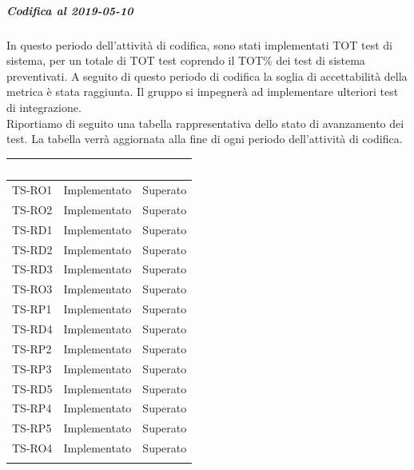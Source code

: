 \subparagraph{Codifica al 2019-05-10}
In questo periodo dell'attività di codifica, sono stati implementati TOT test di sistema, per un totale di TOT test coprendo il TOT\% dei test di sistema preventivati.
A seguito di questo periodo di codifica la soglia di accettabilità della metrica è stata raggiunta.
Il gruppo si impegnerà ad implementare ulteriori test di integrazione.\\
Riportiamo di seguito una tabella rappresentativa dello stato di avanzamento dei test. La tabella verrà aggiornata alla fine di ogni periodo dell'attività di codifica.


\begin{longtable}{|>{\centering\arraybackslash}m{1.6cm}|>{\centering\arraybackslash}m{6.41cm}|>{\centering\arraybackslash}m{3.1cm}|}		
	\rowcolor{LightBlue}
	\textbf{\textcolor{white}{Test}}
	& \textbf{\textcolor{white}{Stato}}
	& \textbf{\textcolor{white}{Esito}}\\
	\hline
		\rowcolor{LightGray}
		TS-RO1
		& Implementato
		& Superato 
		\\ \hline
		\rowcolor{white}
		TS-RO2
		& Implementato
		& Superato 
		\\ \hline
		\rowcolor{LightGray}
		TS-RD1
		& Implementato
		& Superato 
		\\ \hline
		\rowcolor{white}
		TS-RD2
		& Implementato
		& Superato 
		\\ \hline
		\rowcolor{LightGray}
		TS-RD3
		& Implementato
		& Superato 
		\\ \hline
		\rowcolor{white}
		TS-RO3		
		& Implementato
		& Superato 
		\\ \hline
		\rowcolor{LightGray}
		TS-RP1		
		& Implementato
		& Superato 
		\\ \hline
		\rowcolor{white}
		TS-RD4		
		& Implementato
		& Superato 
		\\ \hline
		\rowcolor{LightGray}
		TS-RP2		
		& Implementato
		& Superato 
		\\ \hline
		\rowcolor{white}
		TS-RP3		
		& Implementato
		& Superato 
		\\ \hline
		\rowcolor{LightGray}
		TS-RD5		
		& Implementato
		& Superato 
		\\ \hline
		\rowcolor{white}
		TS-RP4		
		& Implementato
		& Superato 
		\\ \hline
		\rowcolor{LightGray}
		TS-RP5		
		& Implementato
		& Superato 
		\\ \hline
		\rowcolor{white}
		TS-RO4		
		& Implementato
		& Superato 
		\\ \hline
		\rowcolor{LightGray}

\end{longtable}
